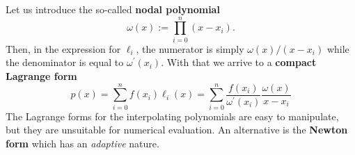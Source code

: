 \documentclass[a4paper]{article}
\begin{document}
\begin{remark}
    Let us introduce the so-called \textbf{nodal polynomial}
    $$
    \omega(x):=\prod_{i=0}^{n}(x-x_{i}) .
    $$
    Then, in the expression for $\ell_{i}$, the numerator is simply $\omega(x) /(x-x_{i})$ while the denominator is equal to $\omega^{\prime}(x_{i})$. With that we arrive to a \textbf{compact Lagrange form}
    \begin{equation}\label{eqn:Lagrange 2}
        p(x)=\sum_{i=0}^{n} f(x_{i}) \ell_{i}(x)=\sum_{i=0}^{n} \frac{f(x_{i})}{\omega^{\prime}(x_{i})} \frac{\omega(x)}{x-x_{i}}
    \end{equation}
    The Lagrange forms for the interpolating polynomials are easy to manipulate, but they are unsuitable for numerical evaluation. An alternative is the \textbf{Newton form} which has an \textit{adaptive} nature.
\end{remark}
\end{document}
